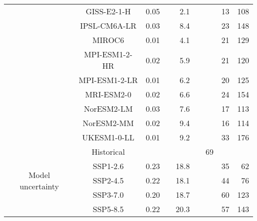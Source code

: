 \begin{table*}[t]
\begin{tabular}{c|c|rr|rr|rrr}
 & GISS-E2-1-H & 0.05 &  & 2.1 &  &  & 13 & 108 \\
 & IPSL-CM6A-LR & 0.03 &  & 8.4 &  &  & 23 & 148 \\
 & MIROC6 & 0.01 &  & 4.1 &  &  & 21 & 129 \\
 & MPI-ESM1-2-HR & 0.02 &  & 5.9 &  &  & 21 & 120 \\
 & MPI-ESM1-2-LR & 0.01 &  & 6.2 &  &  & 20 & 125 \\
 & MRI-ESM2-0 & 0.02 &  & 6.6 &  &  & 24 & 154 \\
 & NorESM2-LM & 0.03 &  & 7.6 &  &  & 17 & 113 \\
 & NorESM2-MM & 0.02 &  & 9.4 &  &  & 16 & 114 \\
 & UKESM1-0-LL & 0.01 &  & 9.2 &  &  & 33 & 176 \\
\cline{1-9}
\multirow[c]{5}{*}{Model uncertainty} & Historical &  &  &  &  & 69 &  &  \\
 & SSP1-2.6 & 0.23 &  & 18.8 &  &  & 35 & 62 \\
 & SSP2-4.5 & 0.22 &  & 18.1 &  &  & 44 & 76 \\
 & SSP3-7.0 & 0.20 &  & 18.7 &  &  & 60 & 123 \\
 & SSP5-8.5 & 0.22 &  & 20.3 &  &  & 57 & 143 \\
\cline{1-9}
\bottomrule
\end{tabular}
\end{table*}
